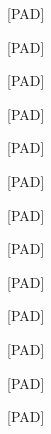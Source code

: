 \documentclass[varwidth=150mm]{standalone}
\begin{document}
\begin{CJK*}{UTF8}{gbsn}
{{{\colorbox{red!0.0}{\strut [PAD]} \colorbox{red!0.0}{\strut [PAD]} \colorbox{red!0.0}{\strut [PAD]} \colorbox{red!0.0}{\strut [PAD]} \colorbox{red!0.0}{\strut [PAD]} \colorbox{red!0.0}{\strut [PAD]} \colorbox{red!0.0}{\strut [PAD]} \colorbox{red!0.0}{\strut [PAD]} \colorbox{red!0.0}{\strut [PAD]} \colorbox{red!0.0}{\strut [PAD]} \colorbox{red!0.0}{\strut [PAD]} \colorbox{red!0.0}{\strut [PAD]} \colorbox{red!0.0}{\strut [PAD]}
}}}
\end{CJK*}
\end{document}
